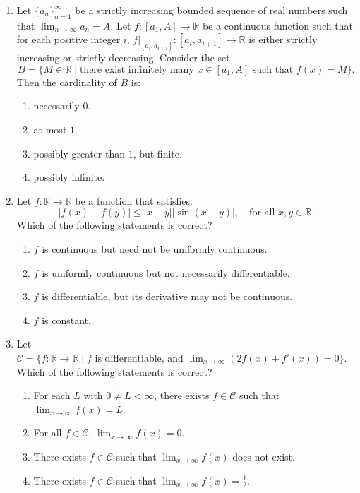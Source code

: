 \documentclass[11pt, a4paper]{article}
\begin{document}
\begin{enumerate}
  \item Let $\{a_n\}_{n=1}^\infty$ be a strictly increasing bounded sequence of real numbers such that $\lim_{n \to \infty} a_n = A$. Let $f: [a_1, A] \to \mathbb{R}$ be a continuous function such that for each positive integer $i$, $f|_{[a_i, a_{i+1}]}: [a_i, a_{i+1}] \to \mathbb{R}$ is either strictly increasing or strictly decreasing. Consider the set
  \[
    B = \{M \in \mathbb{R} \mid \text{there exist infinitely many } x \in [a_1, A] \text{ such that } f(x) = M\}.
  \]
  Then the cardinality of $B$ is:
  \begin{enumerate}[label=(\alph*)]
    \item necessarily $0$.
    \item at most $1$.
    \item possibly greater than $1$, but finite.
    \item possibly infinite.
  \end{enumerate}

  \item Let $f: \mathbb{R} \to \mathbb{R}$ be a function that satisfies:
  \[
    |f(x) - f(y)| \le |x - y| |\sin(x - y)|, \quad \text{for all } x, y \in \mathbb{R}.
  \]
  Which of the following statements is correct?
  \begin{enumerate}[label=(\alph*)]
    \item $f$ is continuous but need not be uniformly continuous.
    \item $f$ is uniformly continuous but not necessarily differentiable.
    \item $f$ is differentiable, but its derivative may not be continuous.
    \item $f$ is constant.
  \end{enumerate}

  \item Let $\mathcal{C} = \{f: \mathbb{R} \to \mathbb{R} \mid f \text{ is differentiable, and } \lim_{x \to \infty} (2f(x) + f'(x)) = 0\}$. Which of the following statements is correct?
  \begin{enumerate}[label=(\alph*)]
    \item For each $L$ with $0 \ne L < \infty$, there exists $f \in \mathcal{C}$ such that $\lim_{x \to \infty} f(x) = L$.
    \item For all $f \in \mathcal{C}$, $\lim_{x \to \infty} f(x) = 0$.
    \item There exists $f \in \mathcal{C}$ such that $\lim_{x \to \infty} f(x)$ does not exist.
    \item There exists $f \in \mathcal{C}$ such that $\lim_{x \to \infty} f(x) = \frac{1}{2}$.
  \end{enumerate}


\end{enumerate}
\end{document}
